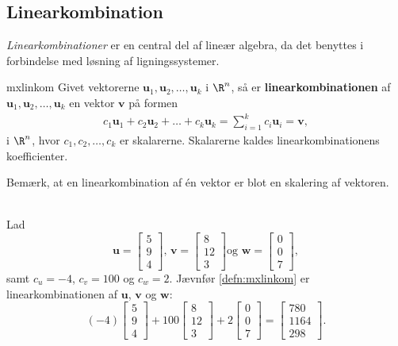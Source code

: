 \subsection{Linearkombination}
\textit{Linearkombinationer} er en central del af lineær algebra, da det benyttes i forbindelse med løsning af ligningssystemer. 
%
\begin{defn}{}{mxlinkom}
Givet vektorerne $\mathbf{u}_1, \mathbf{u}_2, \ldots, \mathbf{u}_k$ i $\R^n$, så er \textbf{linearkombinationen} af $\mathbf{u}_1, \mathbf{u}_2, \ldots, \mathbf{u}_k$ en vektor $\mathbf{v}$ på formen 
%
\begin{align*}
c_1\mathbf{u}_1+c_2\mathbf{u}_2+\ldots+c_k\mathbf{u}_k=\sum\limits_{i=1}^k c_i\mathbf{u}_i=\mathbf{v},
\end{align*}
%
i $\R^n$, hvor $c_1, c_2, \ldots, c_k$ er skalarerne.
Skalarerne kaldes linearkombinationens koefficienter.
%
\end{defn}
%
%
\noindent 
%
Bemærk, at en linearkombination af én vektor er blot en skalering af vektoren.
\\\\
%
\begin{eks}
Lad 
$$
\textbf{u}=
\begin{bmatrix}
5 \\
9 \\
4
\end{bmatrix}
\text{, }
\textbf{v}=
\begin{bmatrix}
8  \\
12 \\ 
3
\end{bmatrix}
\text{og }
\textbf{w}=
\begin{bmatrix}
0 \\
0 \\
7
\end{bmatrix},
$$
samt $c_u=-4$, $c_v=100$ og $c_w=2$. 
Jævnfør \ref{defn:mxlinkom} er linearkombinationen af $\textbf{u}$, $\textbf{v}$ og $\textbf{w}$:
$$
(-4)
\begin{bmatrix}
5 \\ 
9 \\ 
4
\end{bmatrix}
+
100
\begin{bmatrix}
8 \\
12 \\ 
3
\end{bmatrix}
+
2
\begin{bmatrix}
0 \\
0 \\ 
7
\end{bmatrix}
=
\begin{bmatrix}
780 \\
1164 \\ 
298
\end{bmatrix}
\text{.}
$$
\end{eks}

